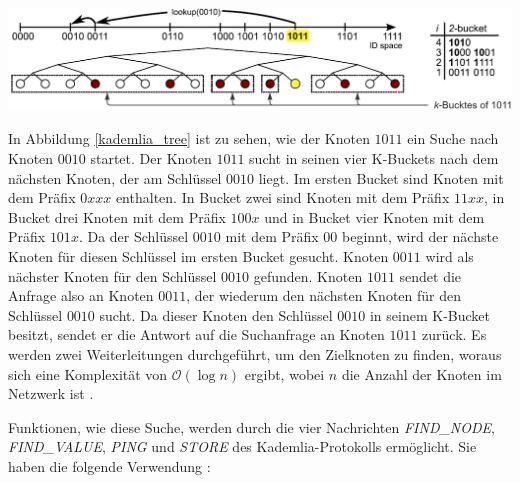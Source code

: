 \begin{center}
    \captionsetup{type=figure}
    \includegraphics[width=1\linewidth]{images/kademlia_tree_altered.png}
    \label{kademlia_tree}
\end{center}

\noindent In Abbildung \ref{kademlia_tree} ist zu sehen, wie der Knoten $1011$ ein Suche nach Knoten $0010$ startet. Der Knoten $1011$ sucht in seinen vier K-Buckets nach dem nächsten Knoten, der am Schlüssel $0010$ liegt. Im ersten Bucket sind Knoten mit dem Präfix $0xxx$ enthalten. In Bucket zwei sind Knoten mit dem Präfix $11xx$, in Bucket drei Knoten mit dem Präfix $100x$ und in Bucket vier Knoten mit dem Präfix $101x$. Da der Schlüssel $0010$ mit dem Präfix $00$ beginnt, wird der nächste Knoten für diesen Schlüssel im ersten Bucket gesucht. Knoten $0011$ wird als nächster Knoten für den Schlüssel $0010$ gefunden. Knoten $1011$ sendet die Anfrage also an Knoten $0011$, der wiederum den nächsten Knoten für den Schlüssel $0010$ sucht. Da dieser Knoten den Schlüssel $0010$ in seinem K-Bucket besitzt, sendet er die Antwort auf die Suchanfrage an Knoten $1011$ zurück. Es werden zwei Weiterleitungen durchgeführt, um den Zielknoten zu finden, woraus sich eine Komplexität von $\mathcal{O}(\log n)$ ergibt, wobei $n$ die Anzahl der Knoten im Netzwerk ist \parencite[S. 812]{MedranoChavez_ChordKademliaHighChurnScenarios}.

Funktionen, wie diese Suche, werden durch die vier Nachrichten \textit{FIND\_NODE}, \\\textit{FIND\_VALUE}, \textit{PING} und \textit{STORE} des Kademlia-Protokolls ermöglicht. Sie haben die folgende Verwendung \Parencite[S. 3]{Maymounkov_Kademlia}:

